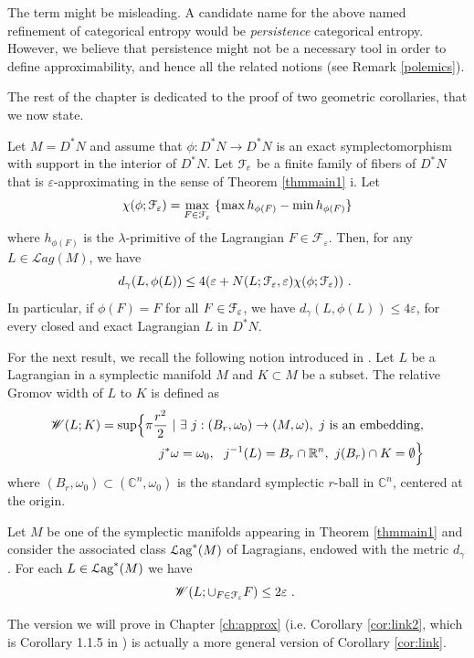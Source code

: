 \begin{remark}
    The term  might be misleading. A candidate name for the above named refinement of categorical entropy would be \textit{persistence} categorical entropy. However, we believe that persistence might not be a necessary tool in order to define approximability, and hence all the related notions (see Remark \ref{polemics}).
\end{remark}

The rest of the chapter is dedicated to the proof of two geometric corollaries, that we now state. 

\begin{cor}\label{cor:quasi-rig} Let $M=D^{\ast}N$ and assume that  $\phi :D^{\ast}N\to D^{\ast}N$ is an exact symplectomorphism with support in the
interior of $D^{\ast}N$. Let $\mathcal F_{\varepsilon}$ be a finite family of fibers of $D^{\ast}N$ that is $\varepsilon$-approximating in the sense of Theorem \ref{thmmain1} i. Let
$$\chi (\phi; \mathcal F_{\varepsilon}) =\max_{F\in\mathcal F_{\varepsilon}}\ \{ \max h_{\phi(F)} - \min h_{\phi(F)}\}$$ where $h_{\phi(F)}$ is the $\lambda$-primitive of the Lagrangian $F\in \mathcal{F}_\varepsilon$.
Then, for any $L\in \mathcal{L}ag(M)$, we have $$d_{\gamma}(L,\phi(L)) \leq 4(\varepsilon + N(L;\mathcal F_{\varepsilon}, \varepsilon) \chi(\phi;\mathcal F_{\varepsilon}))~.~$$
In particular, if $\phi(F)=F$ for all $F\in \mathcal F_{\varepsilon}$, we have $d_{\gamma}(L,\phi(L)) \leq 4\varepsilon$, for every closed and exact Lagrangian $L$ in $D^{\ast}N$.
\end{cor}

For the next result, we recall the following notion introduced in \cite{Bar-Cor:Serre,Bi-Co:rigidity}. Let $L$ be a Lagrangian in a symplectic manifold $M$ and $K\subset M$ be a subset. The relative Gromov width of $L$ to $K$ is defined as \begin{eqnarray*}\mathscr{W}(L; K)=\sup \Bigl\{ \pi \frac{r^{2}}{2} \ | \ \exists\  j: (B_{r}, \omega_{0})\to (M,\omega) , \  j \ \text{is an embedding}, \\ j^{\ast}\omega=\omega_{0}, \ \ j^{-1}(L)= B_{r}\cap \R^{n}, \ j(B_{r})\cap K=\emptyset \Bigr\} 
\end{eqnarray*}
where $(B_{r},\omega_{0})\subset (\mathbb{C}^{n},\omega_{0})$ is the standard symplectic $r$-ball in $\mathbb{C}^{n}$, centered at the origin. 


\begin{cor}\label{cor:link}
Let $M$ be one of the symplectic manifolds appearing in Theorem \ref{thmmain1} and consider the associated class ${\mathcal{L}\text{ag}}^*(M)$ of Lagragians, endowed with the metric $d_\gamma$. 
For each $L\in {\mathcal{L}\text{ag}}^*(M)$ we have
$$\mathscr{W}(L;  \cup_{F\in \mathcal F_{\varepsilon}}F)\leq 2\varepsilon ~.~$$\end{cor}

\begin{remark}
    The version we will prove in Chapter \ref{ch:approx} (i.e. Corollary \ref{cor:link2}, which is Corollary 1.1.5 in \cite{ABC26}) is actually a more general version of Corollary \ref{cor:link}.
\end{remark}